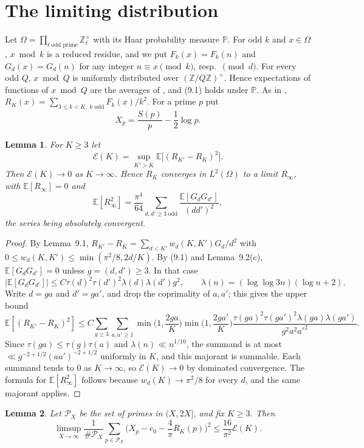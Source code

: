 \documentclass[11pt]{amsart}
\newtheorem{lemma}{Lemma}[section]
\theoremstyle{remark}
\newcommand{\E}{\mathbb{E}}
\newcommand{\Prob}{\mathbb{P}}
\newcommand{\Z}{\mathbb{Z}}
\begin{document}
\section{The limiting distribution}\label{sec:G}

Let $\Omega=\prod_{\ell\ \text{odd prime}}\Z_\ell^\times$ with its Haar probability measure $\Prob$. For odd $k$ and $x\in\Omega$, $x\bmod k$ is a reduced residue, and we put $F_k(x)=F_k(n)$ and $G_d(x)=G_d(n)$ for any integer $n\equiv x\pmod{k}$, resp.\ $\pmod d$. For every odd $Q$, $x\bmod Q$ is uniformly distributed over $(\Z/Q\Z)^\times$. Hence expectations of functions of $x\bmod Q$ are the averages of \cite[Section~9]{TS}, and (9.1) holds under $\Prob$. As in \cite{TS}, $R_K(x)=\sum_{3\le k<K,\ k\text{ odd}}F_k(x)/k^2$. For a prime $p$ put
\[
X_p=\frac{S(p)}p-\frac12\log p .
\]

\begin{lemma}\label{lem:L2}
For $K\ge3$ let
\[
\mathcal E(K)=\sup_{K'>K}\E\big[(R_{K'}-R_K)^2\big].
\]
Then $\mathcal E(K)\to0$ as $K\to\infty$. Hence $R_K$ converges in $L^2(\Omega)$ to a limit $R_\infty$, with $\E[R_\infty]=0$ and
\[
\E[R_\infty^2]=\frac{\pi^4}{64}\sum_{d,d'\ge3\ \mathrm{odd}}\frac{\E[G_dG_{d'}]}{(dd')^2},
\]
the series being absolutely convergent.
\end{lemma}

\begin{proof}
By Lemma~9.1, $R_{K'}-R_K=\sum_{d<K'}w_d(K,K')G_d/d^2$ with $0\le w_d(K,K')\le\min(\pi^2/8,2d/K)$. By (9.1) and Lemma~9.2(c), $\E[G_dG_{d'}]=0$ unless $g=(d,d')\ge3$. In that case
\[
|\E[G_dG_{d'}]|\le C\tau(d)^2\tau(d')^2\lambda(d)\lambda(d')g^2,\qquad \lambda(n)=(\log\log3n)(\log n+2).
\]
Write $d=ga$ and $d'=ga'$, and drop the coprimality of $a,a'$; this gives the upper bound
\[
\E[(R_{K'}-R_K)^2]\le C\sum_{g\ge3}\sum_{a,a'\ge1}\min\Big(1,\frac{2ga}{K}\Big)\min\Big(1,\frac{2ga'}{K}\Big)\frac{\tau(ga)^2\tau(ga')^2\lambda(ga)\lambda(ga')}{g^2a^2a'^2}.
\]
Since $\tau(ga)\le\tau(g)\tau(a)$ and $\lambda(n)\ll n^{1/10}$, the summand is at most $\ll g^{-2+1/2}(aa')^{-2+1/2}$ uniformly in $K$, and this majorant is summable. Each summand tends to $0$ as $K\to\infty$, so $\mathcal E(K)\to0$ by dominated convergence. The formula for $\E[R_\infty^2]$ follows because $w_d(K)\to\pi^2/8$ for every $d$, and the same majorant applies.
\end{proof}

\begin{lemma}\label{lem:approx}
Let $\mathcal P_X$ be the set of primes in $(X,2X]$, and fix $K\ge3$. Then
\[
\limsup_{X\to\infty}\frac1{\#\mathcal P_X}\sum_{p\in\mathcal P_X}\Big(X_p-c_0-\frac4\pi R_K(p)\Big)^2\le\frac{16}{\pi^2}\mathcal E(K).
\]
\end{lemma}
\end{document}
